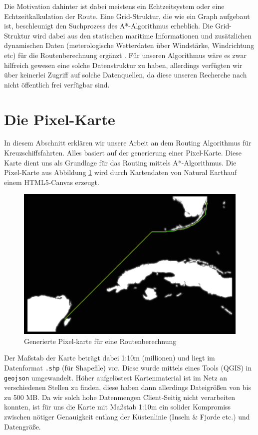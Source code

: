 \documentclass[letterpaper]{article}
\begin{document}
	Die Motivation dahinter ist dabei meistens ein Echtzeitsystem oder eine Echtzeitkalkulation der Route. Eine Grid-Struktur, die wie ein Graph aufgebaut ist, beschleunigt den Suchprozess des A*-Algorithmus erheblich\cite{patel16}. Die Grid-Struktur wird dabei aus den statischen maritime Informationen und zusätzlichen dynamischen Daten (meterologische Wetterdaten über Windstärke, Windrichtung etc) für die Routenberechnung ergänzt \cite[s. 2]{makrygiorgos15}.
	Für unseren Algorithmus wäre es zwar hilfreich gewesen eine solche Datenstruktur zu haben, allerdings verfügten wir über keinerlei Zugriff auf solche Datenquellen, da diese unseren Recherche nach nicht öffentlich frei verfügbar sind.

\section{Die Pixel-Karte}
	In diesem Abschnitt erklären wir unsere Arbeit an dem Routing Algorithmus für Kreuzschiffsfahrten. Alles basiert auf der generierung einer Pixel-Karte. Diese Karte dient uns als Grundlage für das Routing mittels A*-Algorithmus. Die Pixel-Karte aus Abbildung \ref{fig:Pixel Map Miami} wird durch Kartendaten von Natural Earth\footnotemark auf einem HTML5-Canvas erzeugt. 


	\begin{figure}[!htbp]
		\centering
		\includegraphics[width=\linewidth]{pixel_map_miami}
		\caption{Generierte Pixel-karte für eine Routenberechnung}
		\label{fig:Pixel Map Miami}
	\end{figure}

	Der Maßstab der Karte beträgt dabei 1:10m (millionen) und liegt im Datenformat \texttt{.shp} (für Shapefile) vor. Diese wurde mittels eines Tools (QGIS) in \texttt{geojson} umgewandelt. Höher aufgelöstest Kartenmaterial ist im Netz an verschiedenen Stellen zu finden\footnotemark, diese haben dann allerdings Dateigrößen von bis zu 500 MB. Da wir solch hohe Datenmengen Client-Seitig nicht verarbeiten konnten, ist für uns die Karte mit Maßstab 1:10m ein solider Kompromiss zwischen nötiger Genauigkeit entlang der Küstenlinie (Inseln \& Fjorde etc.) und Datengröße.
\end{document}
